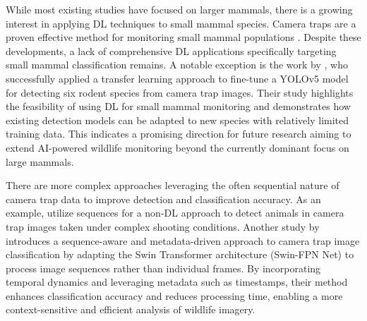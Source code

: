 While most existing studies have focused on larger mammals, there is a growing interest in applying \ac{DL} techniques to small mammal species.
Camera traps are a proven effective method for monitoring small mammal populations \autocite{clucasCameraTrapMethod2025,aegerterMonitoringKleinmustelidenSchlaefern2019,littlewoodUseNovelCamera2021}.
Despite these developments, a lack of comprehensive \ac{DL} applications specifically targeting small mammal classification remains.
A notable exception is the work by \textcite{hopkinsDetectingMonitoringRodents2024}, who successfully applied a transfer learning approach to fine-tune a YOLOv5 model for detecting six rodent species from camera trap images.
Their study highlights the feasibility of using \ac{DL} for small mammal monitoring and demonstrates how existing detection models can be adapted to new species with relatively limited training data.
This indicates a promising direction for future research aiming to extend \ac{AI}-powered wildlife monitoring beyond the currently dominant focus on large mammals.

There are more complex approaches leveraging the often sequential nature of camera trap data to improve detection and classification accuracy.
As an example, \textcite{zotinANIMALDETECTIONUSING2019} utilize sequences for a non-\ac{DL} approach to detect animals in camera trap images taken under complex shooting conditions.
Another study by \textcite{muhammadTemporalSwinFPNNetNovel2024} introduces a sequence-aware and metadata-driven approach to camera trap image classification by adapting the Swin Transformer architecture (Swin-FPN Net) to process image sequences rather than individual frames.
By incorporating temporal dynamics and leveraging metadata such as timestamps, their method enhances classification accuracy and reduces processing time, enabling a more context-sensitive and efficient analysis of wildlife imagery.

